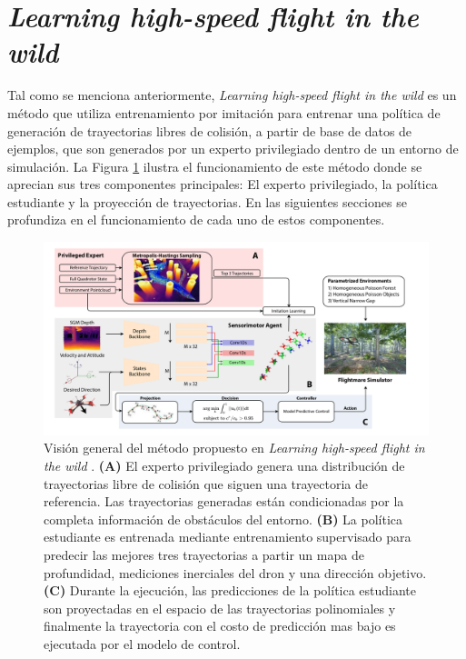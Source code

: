 \section{\textit{Learning high-speed flight in the wild}}

\label{sec::prev-agile-autonomy}

Tal como se menciona anteriormente, \textit{Learning high-speed flight in the wild} \cite{Loquercio2021} es un método que utiliza entrenamiento por imitación para entrenar una política de generación de trayectorias libres de colisión, a partir de base de datos de ejemplos, que son generados por un experto privilegiado dentro de un entorno de simulación. La Figura \ref{fig:prev-agile-autonomy-overview} ilustra el funcionamiento de este método donde se aprecian sus tres componentes principales: El experto privilegiado, la política estudiante y la proyección de trayectorias. En las siguientes secciones se profundiza en el funcionamiento de cada uno de estos componentes.

\begin{figure}[H]
    \centering
    \includegraphics[scale=0.3]{partes/img/agile-autonomy-overview.png}
    \caption[Visión general del método propuesto en \textit{Learning high-speed flight in the wild}]{Visión general del método propuesto en \textit{Learning high-speed flight in the wild} \cite{Loquercio2021}. \textbf{(A)} El experto privilegiado genera una distribución de trayectorias libre de colisión que siguen una trayectoria de referencia. Las trayectorias generadas están condicionadas por la completa información de obstáculos del entorno. \textbf{(B)} La política estudiante es entrenada mediante entrenamiento supervisado para predecir las mejores tres trayectorias a partir un mapa de profundidad, mediciones inerciales del dron y una dirección objetivo. \textbf{(C)} Durante la ejecución, las predicciones de la política estudiante son proyectadas en el espacio de las trayectorias polinomiales y finalmente la trayectoria con el costo de predicción mas bajo es ejecutada por el modelo de control. }
    \label{fig:prev-agile-autonomy-overview}
\end{figure}


